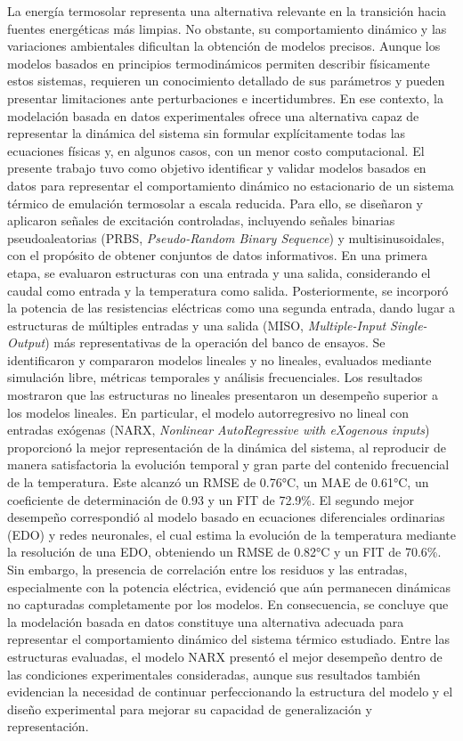 \documentclass[11pt]{report}
\begin{document}
La energía termosolar representa una alternativa relevante en la transición hacia fuentes energéticas más limpias. No obstante, su comportamiento dinámico y las variaciones ambientales dificultan la obtención de modelos precisos. Aunque los modelos basados en principios termodinámicos permiten describir físicamente estos sistemas, requieren un conocimiento detallado de sus parámetros y pueden presentar limitaciones ante perturbaciones e incertidumbres. En ese contexto, la modelación basada en datos experimentales ofrece una alternativa capaz de representar la dinámica del sistema sin formular explícitamente todas las ecuaciones físicas y, en algunos casos, con un menor costo computacional. El presente trabajo tuvo como objetivo identificar y validar modelos basados en datos para representar el comportamiento dinámico no estacionario de un sistema térmico de emulación termosolar a escala reducida. Para ello, se diseñaron y aplicaron señales de excitación controladas, incluyendo señales binarias pseudoaleatorias (PRBS, \textit{Pseudo-Random Binary Sequence}) y multisinusoidales, con el propósito de obtener conjuntos de datos informativos. 
En una primera etapa, se evaluaron estructuras con una entrada y una salida, considerando el caudal como entrada y la temperatura como salida. Posteriormente, se incorporó la potencia de las resistencias eléctricas como una segunda entrada, dando lugar a estructuras de múltiples entradas y una salida (MISO, \textit{Multiple-Input Single-Output}) más representativas de la operación del banco de ensayos. Se identificaron y compararon modelos lineales y no lineales, evaluados mediante simulación libre, métricas temporales y análisis frecuenciales. 
Los resultados mostraron que las estructuras no lineales presentaron un desempeño superior a los modelos lineales. En particular, el modelo autorregresivo no lineal con entradas exógenas (NARX, \textit{Nonlinear AutoRegressive with eXogenous inputs}) proporcionó la mejor representación de la dinámica del sistema, al reproducir de manera satisfactoria la evolución temporal y gran parte del contenido frecuencial de la temperatura. Este alcanzó un RMSE de 0.76°C, un MAE de 0.61°C, un coeficiente de determinación de 0.93 y un FIT de 72.9\%. El segundo mejor desempeño correspondió al modelo basado en ecuaciones diferenciales ordinarias (EDO) y redes neuronales, el cual estima la evolución de la temperatura mediante la resolución de una EDO, obteniendo un RMSE de 0.82°C y un FIT de 70.6\%.
Sin embargo, la presencia de correlación entre los residuos y las entradas, especialmente con la potencia eléctrica, evidenció que aún permanecen dinámicas no capturadas completamente por los modelos. En consecuencia, se concluye que la modelación basada en datos constituye una alternativa adecuada para representar el comportamiento dinámico del sistema térmico estudiado. Entre las estructuras evaluadas, el modelo NARX presentó el mejor desempeño dentro de las condiciones experimentales consideradas, aunque sus resultados también evidencian la necesidad de continuar perfeccionando la estructura del modelo y el diseño experimental para mejorar su capacidad de generalización y representación.
\end{document}
